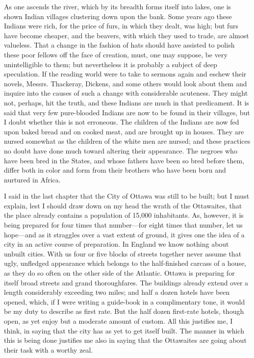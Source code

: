 As one ascends the river, which by its breadth forms itself into
lakes, one is shown Indian villages clustering down upon the bank.
Some years ago these Indians were rich, for the price of furs, in
which they dealt, was high; but furs have become cheaper, and the
beavers, with which they used to trade, are almost valueless.  That
a change in the fashion of hats should have assisted to polish
these poor fellows off the face of creation, must, one may suppose,
be very unintelligible to them; but nevertheless it is probably a
subject of deep speculation.  If the reading world were to take to
sermons again and eschew their novels, Messrs. Thackeray, Dickens,
and some others would look about them and inquire into the causes
of such a change with considerable acuteness.  They might not,
perhaps, hit the truth, and these Indians are much in that
predicament.  It is said that very few pure-blooded Indians are now
to be found in their villages, but I doubt whether this is not
erroneous.  The children of the Indians are now fed upon baked
bread and on cooked meat, and are brought up in houses.  They are
nursed somewhat as the children of the white men are nursed; and
these practices no doubt have done much toward altering their
appearance.  The negroes who have been bred in the States, and
whose fathers have been so bred before them, differ both in color
and form from their brothers who have been born and nurtured in
Africa.

I said in the last chapter that the City of Ottawa was still to be
built; but I must explain, lest I should draw down on my head the
wrath of the Ottawaites, that the place already contains a
population of 15,000 inhabitants.  As, however, it is being
prepared for four times that number---for eight times that number,
let us hope---and as it straggles over a vast extent of ground, it
gives one the idea of a city in an active course of preparation.
In England we know nothing about unbuilt cities.  With us four or
five blocks of streets together never assume that ugly, unfledged
appearance which belongs to the half-finished carcass of a house,
as they do so often on the other side of the Atlantic.  Ottawa is
preparing for itself broad streets and grand thoroughfares.  The
buildings already extend over a length considerably exceeding two
miles; and half a dozen hotels have been opened, which, if I were
writing a guide-book in a complimentary tone, it would be my duty
to describe as first rate.  But the half dozen first-rate hotels,
though open, as yet enjoy but a moderate amount of custom.  All
this justifies me, I think, in saying that the city has as yet to
get itself built.  The manner in which this is being done justifies
me also in saying that the Ottawaites are going about their task
with a worthy zeal.

